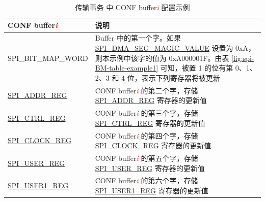 \documentclass[main\_\_CN.tex]{subfiles}
\begin{document}
\begin{longtable}[c]{|L{3.5cm}|p{10.5cm}| }
\caption{传输事务  中 CONF buffer\textcolor{red}{\it i} 配置示例}
\label{fig:spi-BM-table-example2}\\\hline
{}
     CONF buffer\textcolor{red}{\it i} & 说明 \\\hline
     SPI\_BIT\_MAP\_WORD & Buffer 中的第一个字。如果 \hyperref[fielddesc:SPIDMASEGMAGICVALUE]{SPI\_DMA\_SEG\_MAGIC\_VALUE} 设置为 0xA，则本示例中该字的值为 0xA000001F。由表 \ref{fig:spi-BM-table-example1} 可知，被置 1 的位有第 0、1、2、3 和 4 位，表示下列寄存器将被更新 \\\hline

    \hyperref[regdesc:SPIADDRREG]{SPI\_ADDR\_REG} & CONF buffer\textcolor{red}{\it i} 的第二个字，存储 \hyperref[regdesc:SPIADDRREG]{SPI\_ADDR\_REG} 寄存器的更新值
     \\\hline
    \hyperref[regdesc:SPICTRLREG]{SPI\_CTRL\_REG} & CONF buffer\textcolor{red}{\it i} 的第三个字，存储 \hyperref[regdesc:SPICTRLREG]{SPI\_CTRL\_REG} 寄存器的更新值
     \\\hline
    \hyperref[regdesc:SPICLOCKREG]{SPI\_CLOCK\_REG} & CONF buffer\textcolor{red}{\it i} 的第四个字，存储 \hyperref[regdesc:SPICLOCKREG]{SPI\_CLOCK\_REG} 寄存器的更新值
     \\\hline
    \hyperref[regdesc:SPIUSERREG]{SPI\_USER\_REG} & CONF buffer\textcolor{red}{\it i} 的第五个字，存储 \hyperref[regdesc:SPIUSERREG]{SPI\_USER\_REG} 寄存器的更新值
     \\\hline
    \hyperref[regdesc:SPIUSER1REG]{SPI\_USER1\_REG}  & CONF buffer\textcolor{red}{\it i} 的第六个字，存储 \hyperref[regdesc:SPIUSER1REG]{SPI\_USER1\_REG} 寄存器的更新值
     \\\hline
\end{longtable}
\end{document}

